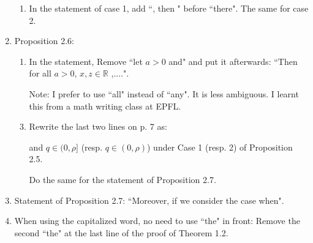 \documentclass[a4paper,10pt]{article}
\def\R{\mathbb{R}}
\begin{document}
\begin{enumerate}
\begin{enumerate}
      \item In the statement of case 1, add ``, then " before ``there". The same for case 2.
    \end{enumerate}
  \item Proposition 2.6:
    \begin{enumerate}
      \item In the statement, Remove ``let $a>0$ and" and put it afterwards: ``Then for all $a>0$, $x,z\in \R$ ,....".
      \item[Note:] I prefer to use ``all" instead of ``any". It is less ambiguous. I learnt this from a math writing
        class at EPFL.
      \item Rewrite the last two lines on p. 7 as:
        \begin{center}
          and $q\in (0,\rho]$ (resp. $q\in (0,\rho)$) under Case 1 (resp. 2) of Proposition 2.5.
        \end{center}
        Do the same for the statement of Proposition 2.7.
    \end{enumerate}
  \item Statement of Proposition 2.7: ``Moreover, if we consider the case when".
  \item When using the capitalized word, no need to use ``the" in front: Remove the second ``the" at the last line of
    the proof of Theorem 1.2.
\end{enumerate}
\end{document}
